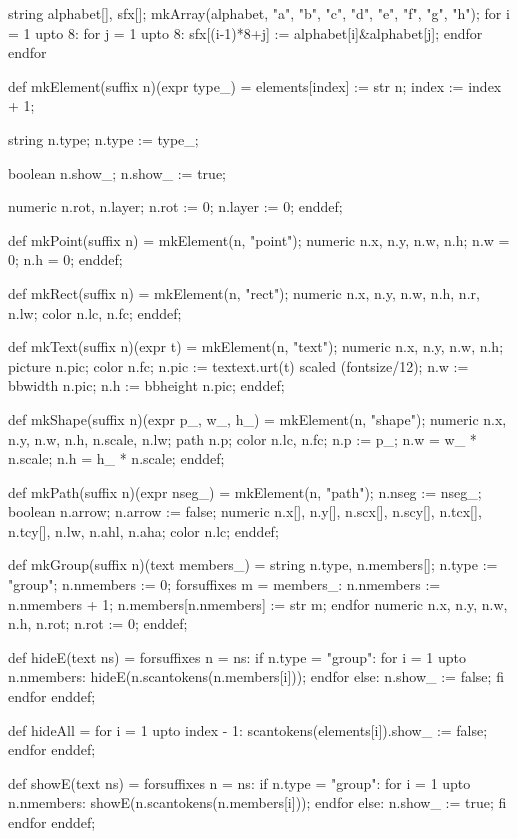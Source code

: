 string alphabet[], sfx[];
mkArray(alphabet, "a", "b", "c", "d", "e", "f", "g", "h");
for i = 1 upto 8:
  for j = 1 upto 8:
    sfx[(i-1)*8+j] := alphabet[i]&alphabet[j];
  endfor
endfor

def mkElement(suffix n)(expr type_) =
  elements[index] := str n;
  index := index + 1;

  string n.type;
  n.type := type_;

  boolean n.show_;
  n.show_ := true;

  numeric n.rot, n.layer;
  n.rot := 0;
  n.layer := 0;
enddef;

def mkPoint(suffix n) =
  mkElement(n, "point");
  numeric n.x, n.y, n.w, n.h;
  n.w = 0;
  n.h = 0;
enddef;

def mkRect(suffix n) =
  mkElement(n, "rect");
  numeric n.x, n.y, n.w, n.h, n.r, n.lw;
  color n.lc, n.fc;
enddef;

def mkText(suffix n)(expr t) =
  mkElement(n, "text");
  numeric n.x, n.y, n.w, n.h;
  picture n.pic;
  color n.fc;
  n.pic := textext.urt(t) scaled (fontsize/12);
  n.w := bbwidth n.pic;
  n.h := bbheight n.pic;
enddef;

def mkShape(suffix n)(expr p_, w_, h_) =
  mkElement(n, "shape");
  numeric n.x, n.y, n.w, n.h, n.scale, n.lw;
  path n.p;
  color n.lc, n.fc;
  n.p := p_;
  n.w = w_ * n.scale;
  n.h = h_ * n.scale;
enddef;

def mkPath(suffix n)(expr nseg_) =
  mkElement(n, "path");
  n.nseg := nseg_;
  boolean n.arrow;
  n.arrow := false;
  numeric n.x[], n.y[], n.scx[], n.scy[], n.tcx[], n.tcy[], n.lw, n.ahl, n.aha;
  color n.lc;
enddef;

def mkGroup(suffix n)(text members_) =
  string n.type, n.members[];
  n.type := "group";
  n.nmembers := 0;
  forsuffixes m = members_:
    n.nmembers := n.nmembers + 1;
    n.members[n.nmembers] := str m;
  endfor
  numeric n.x, n.y, n.w, n.h, n.rot;
  n.rot := 0;
enddef;

def hideE(text ns) =
  forsuffixes n = ns:
    if n.type = "group":
      for i = 1 upto n.nmembers:
        hideE(n.scantokens(n.members[i]));
      endfor
    else:
      n.show_ := false;
    fi
  endfor
enddef;

def hideAll =
  for i = 1 upto index - 1:
    scantokens(elements[i]).show_ := false;
  endfor
enddef;

def showE(text ns) =
  forsuffixes n = ns:
    if n.type = "group":
      for i = 1 upto n.nmembers:
        showE(n.scantokens(n.members[i]));
      endfor
    else:
      n.show_ := true;
    fi
  endfor
enddef;

